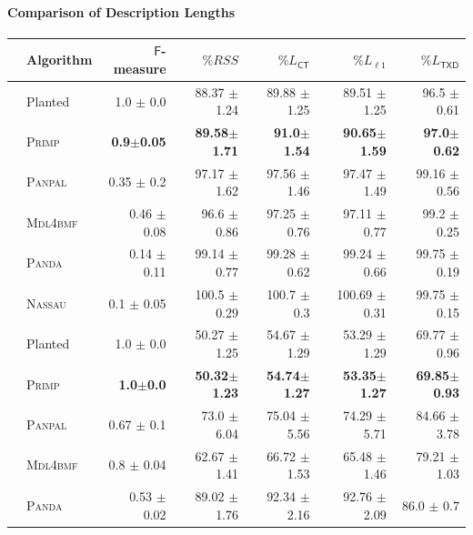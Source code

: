 \paragraph{Comparison of Description Lengths}
\begin{table}%
	\centering
    \begin{adjustbox}{max width=\textwidth}
	\begin{tabular}{clrrrrr}\toprule
 & Algorithm & $\mathsf{F}$-measure & $\%RSS$ & $\%L_{\mathsf{CT}}$ & $\%L_{\ell 1}$  & $\%L_{\mathsf{TXD}}$  \\ \midrule
 \rowcolor{black!10}
\multirow{6}{*}{\cellcolor{white}\rotatebox{90}{ $p_\pm=25\%$ }  } 
&Planted& 1.0 $\pm$ 0.0 & 88.37 $\pm$ 1.24 & 89.88 $\pm$ 1.25 & 89.51 $\pm$ 1.25 & 96.5 $\pm$ 0.61\\
 & \textsc{Primp} & \textbf{0.9}$\pm$\textbf{0.05} & \textbf{89.58}$\pm$\textbf{1.71} & \textbf{91.0}$\pm$\textbf{1.54} & \textbf{90.65}$\pm$\textbf{1.59} & \textbf{97.0}$\pm$\textbf{0.62}\\
 & \textsc{Panpal} & 0.35 $\pm$ 0.2 & 97.17 $\pm$ 1.62 & 97.56 $\pm$ 1.46 & 97.47 $\pm$ 1.49 & 99.16 $\pm$ 0.56\\
 & \textsc{Mdl4bmf} & 0.46 $\pm$ 0.08 & 96.6 $\pm$ 0.86 & 97.25 $\pm$ 0.76 & 97.11 $\pm$ 0.77 & 99.2 $\pm$ 0.25\\
 & \textsc{Panda} & 0.14 $\pm$ 0.11 & 99.14 $\pm$ 0.77 & 99.28 $\pm$ 0.62 & 99.24 $\pm$ 0.66 & 99.75 $\pm$ 0.19\\
 & \textsc{Nassau} & 0.1 $\pm$ 0.05 & 100.5 $\pm$ 0.29 & 100.7 $\pm$ 0.3 & 100.69 $\pm$ 0.31 & 99.75 $\pm$ 0.15\\
 \midrule
\rowcolor{black!10}
\multirow{6}{*}{\cellcolor{white}\rotatebox{90}{ $r^* = 45$ }  }  
& Planted & 1.0 $\pm$ 0.0 &  50.27 $\pm$ 1.25 & 54.67 $\pm$ 1.29 & 53.29 $\pm$ 1.29 & 69.77 $\pm$ 0.96\\
 & \textsc{Primp} & \textbf{1.0}$\pm$\textbf{0.0} & \textbf{50.32}$\pm$\textbf{1.23} & \textbf{54.74}$\pm$\textbf{1.27} & \textbf{53.35}$\pm$\textbf{1.27} & \textbf{69.85}$\pm$\textbf{0.93}\\
 & \textsc{Panpal} & 0.67 $\pm$ 0.1 & 73.0 $\pm$ 6.04 & 75.04 $\pm$ 5.56 & 74.29 $\pm$ 5.71 & 84.66 $\pm$ 3.78\\
 & \textsc{Mdl4bmf} & 0.8 $\pm$ 0.04 & 62.67 $\pm$ 1.41 & 66.72 $\pm$ 1.53 & 65.48 $\pm$ 1.46 & 79.21 $\pm$ 1.03\\
 & \textsc{Panda} & 0.53 $\pm$ 0.02 & 89.02 $\pm$ 1.76 & 92.34 $\pm$ 2.16 & 92.76 $\pm$ 2.09 & 86.0 $\pm$ 0.7\\

\end{tabular}
\end{adjustbox}
\end{table}
